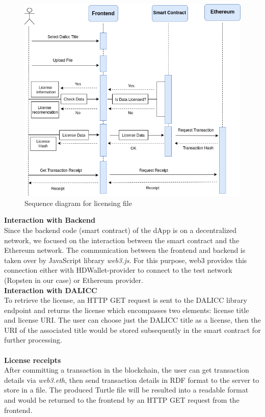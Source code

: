  \begin{center}
 	
 	\begin{figure}[htb!]
 		
 		\begin{minipage}{0.75\linewidth}
 			
 			\includegraphics[width=1.45\textwidth]{images/chap03_user_roadmap.png}
 		\end{minipage}
 		\caption{Sequence diagram for licensing file}
  	\end{figure}
  \end{center}
  \textbf{Interaction with Backend}\\
  Since the backend code (smart contract) of the dApp is on a decentralized network, we focused on the interaction between the smart contract and the Ethereum network. The communication between the frontend and backend is taken over by JavaScript library \textit{web3.js}.
  For this purpose, web3 provides this connection either with HDWallet-provider to connect to the test network (Ropsten in our case) or Ethereum provider.\\
 \textbf{Interaction with DALICC} \\
To retrieve the license, an HTTP GET request is sent to the DALICC library endpoint and returns the license which encompasses two elements: license title and license URI. The user can choose just the DALICC title as a license, then the URI of the associated title would be stored subsequently in the smart contract for further processing. \\
\\
\textbf{License receipts} \\
After committing a transaction in the blockchain, the user can get transaction details via \textit{web3.eth}, then send transaction details in RDF format to the server to store in a file. The produced Turtle file will be resulted into a readable format and would be returned to the frontend by an HTTP GET request from the frontend.
\\
